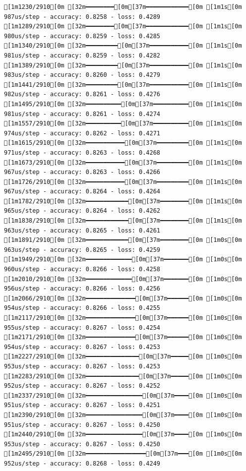 \documentclass[
  letterpaper,
  DIV=11,
  numbers=noendperiod]{scrartcl}
\begin{document}
\begin{verbatim}
[1m1230/2910[0m [32m━━━━━━━━[0m[37m━━━━━━━━━━━━[0m [1m1s[0m 987us/step - accuracy: 0.8258 - loss: 0.4289
[1m1289/2910[0m [32m━━━━━━━━[0m[37m━━━━━━━━━━━━[0m [1m1s[0m 980us/step - accuracy: 0.8259 - loss: 0.4285
[1m1340/2910[0m [32m━━━━━━━━━[0m[37m━━━━━━━━━━━[0m [1m1s[0m 981us/step - accuracy: 0.8259 - loss: 0.4282
[1m1389/2910[0m [32m━━━━━━━━━[0m[37m━━━━━━━━━━━[0m [1m1s[0m 983us/step - accuracy: 0.8260 - loss: 0.4279
[1m1441/2910[0m [32m━━━━━━━━━[0m[37m━━━━━━━━━━━[0m [1m1s[0m 982us/step - accuracy: 0.8261 - loss: 0.4276
[1m1495/2910[0m [32m━━━━━━━━━━[0m[37m━━━━━━━━━━[0m [1m1s[0m 981us/step - accuracy: 0.8261 - loss: 0.4274
[1m1557/2910[0m [32m━━━━━━━━━━[0m[37m━━━━━━━━━━[0m [1m1s[0m 974us/step - accuracy: 0.8262 - loss: 0.4271
[1m1615/2910[0m [32m━━━━━━━━━━━[0m[37m━━━━━━━━━[0m [1m1s[0m 971us/step - accuracy: 0.8263 - loss: 0.4268
[1m1673/2910[0m [32m━━━━━━━━━━━[0m[37m━━━━━━━━━[0m [1m1s[0m 967us/step - accuracy: 0.8263 - loss: 0.4266
[1m1726/2910[0m [32m━━━━━━━━━━━[0m[37m━━━━━━━━━[0m [1m1s[0m 967us/step - accuracy: 0.8264 - loss: 0.4264
[1m1782/2910[0m [32m━━━━━━━━━━━━[0m[37m━━━━━━━━[0m [1m1s[0m 965us/step - accuracy: 0.8264 - loss: 0.4262
[1m1838/2910[0m [32m━━━━━━━━━━━━[0m[37m━━━━━━━━[0m [1m1s[0m 963us/step - accuracy: 0.8265 - loss: 0.4261
[1m1891/2910[0m [32m━━━━━━━━━━━━[0m[37m━━━━━━━━[0m [1m0s[0m 963us/step - accuracy: 0.8265 - loss: 0.4259
[1m1949/2910[0m [32m━━━━━━━━━━━━━[0m[37m━━━━━━━[0m [1m0s[0m 960us/step - accuracy: 0.8266 - loss: 0.4258
[1m2010/2910[0m [32m━━━━━━━━━━━━━[0m[37m━━━━━━━[0m [1m0s[0m 956us/step - accuracy: 0.8266 - loss: 0.4256
[1m2066/2910[0m [32m━━━━━━━━━━━━━━[0m[37m━━━━━━[0m [1m0s[0m 954us/step - accuracy: 0.8266 - loss: 0.4255
[1m2117/2910[0m [32m━━━━━━━━━━━━━━[0m[37m━━━━━━[0m [1m0s[0m 955us/step - accuracy: 0.8267 - loss: 0.4254
[1m2171/2910[0m [32m━━━━━━━━━━━━━━[0m[37m━━━━━━[0m [1m0s[0m 954us/step - accuracy: 0.8267 - loss: 0.4253
[1m2227/2910[0m [32m━━━━━━━━━━━━━━━[0m[37m━━━━━[0m [1m0s[0m 953us/step - accuracy: 0.8267 - loss: 0.4253
[1m2283/2910[0m [32m━━━━━━━━━━━━━━━[0m[37m━━━━━[0m [1m0s[0m 952us/step - accuracy: 0.8267 - loss: 0.4252
[1m2337/2910[0m [32m━━━━━━━━━━━━━━━━[0m[37m━━━━[0m [1m0s[0m 951us/step - accuracy: 0.8267 - loss: 0.4251
[1m2390/2910[0m [32m━━━━━━━━━━━━━━━━[0m[37m━━━━[0m [1m0s[0m 951us/step - accuracy: 0.8267 - loss: 0.4250
[1m2440/2910[0m [32m━━━━━━━━━━━━━━━━[0m[37m━━━━[0m [1m0s[0m 953us/step - accuracy: 0.8267 - loss: 0.4250
[1m2495/2910[0m [32m━━━━━━━━━━━━━━━━━[0m[37m━━━[0m [1m0s[0m 952us/step - accuracy: 0.8268 - loss: 0.4249

\end{verbatim}
\end{document}

